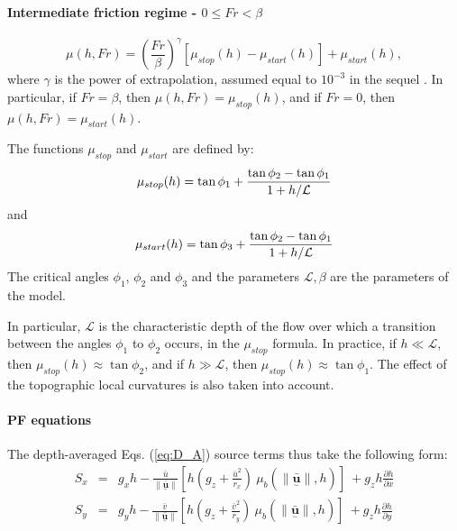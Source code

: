 \documentclass{article}
\begin{document}
\paragraph{Intermediate friction regime - $0 \le Fr < \beta$}
\begin{equation}\label{mu_beta2}
\mu(h, Fr)=\left(\frac{Fr}{\beta}\right)^\gamma [\mu_{stop}(h)-\mu_{start}(h)] + \mu_{start}(h),
\end{equation}
where $\gamma$ is the power of extrapolation, assumed equal to $10^{-3}$ in the sequel \citep{PouliquenForterre2002}. In particular, if $Fr=\beta$, then $\mu(h, Fr)=\mu_{stop}(h)$, and if $Fr = 0$, then $\mu(h, Fr)=\mu_{start}(h)$.

The functions $\mu_{stop}$ and $\mu_{start}$ are defined by:
\begin{equation}\label{mu-stop}
\mu_{stop}(h)=\tan\phi_{1} + \frac{\tan\phi_{2}-\tan\phi_{1}}{1+h/\it \mathcal{L}}
\end{equation}
and
\begin{equation}\label{mu-start}
\mu_{start}(h)=\tan\phi_{3} + \frac{\tan\phi_{2}-\tan\phi_{1}}{1+h/\it \mathcal{L}}
\end{equation}
The critical angles $\phi_{1}$, $\phi_{2}$ and $\phi_{3}$ and the parameters $\mathcal{L}, \beta$ are the parameters of the model.

In particular, $\mathcal{L}$ is the characteristic depth of the flow over which a transition between the angles $\phi_{1}$ to $\phi_{2}$ occurs, in the $\mu_{stop}$ formula. In practice, if $h\ll \mathcal L$, then $\mu_{stop}(h)\approx \tan\phi_{2}$, and if $h\gg \mathcal L$, then $\mu_{stop}(h)\approx\tan\phi_{1}$. The effect of the topographic local curvatures is also taken into account.

\paragraph{PF equations} The depth-averaged Eqs. (\ref{eq:D_A}) source terms thus take the following form:
\begin{eqnarray}\label{eq:S_terms_PF}
S_{x} &=&  g_{x} h -  \frac{\bar{u}}{\| \underset{^\sim}{\bar{\textbf{u}}} \|}\left[h \left(g_z+\frac{\bar{u}^2}{r_x}\right) \ \mu_{b}(\|\underset{^\sim}{\bar{\textbf{u}}} \| , h)\right] \ + g_{z}h\frac{\partial h}{\partial x} \nonumber \\
S_{y} &=&  g_{y} h - \frac{\bar{v}}{\| \underset{^\sim}{\bar{\textbf{u}}} \|}\left[h \left(g_z +\frac{\bar{v}^2}{r_y}\right) \ \mu_{b}(\|\underset{^\sim}{\bar{\textbf{u}}} \| , h)\right] \ + g_{z}h\frac{\partial h}{\partial y}
\end{eqnarray}
\end{document}
